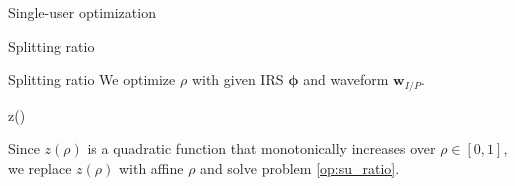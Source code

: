 \documentclass[9pt]{beamer}
\begin{document}
\begin{section}{Single-user optimization}
	\begin{subsection}{Splitting ratio}
		\begin{frame}{Splitting ratio}
			We optimize $\rho$ with given IRS $\boldsymbol{\phi}$ and waveform $\boldsymbol{w}_{I/P}$.
			\begin{maxi!}
				{\rho}{z(\rho)}{\label{op:su_ratio}}{\label{eq:su_ratio_target}}
			\end{maxi!}
			Since $z(\rho)$ is a quadratic function that monotonically increases over $\rho \in [0, 1]$, we replace $z(\rho)$ with affine $\rho$ and solve problem \ref{op:su_ratio}.
		\end{frame}
	\end{subsection}
\end{section}



\end{document}
